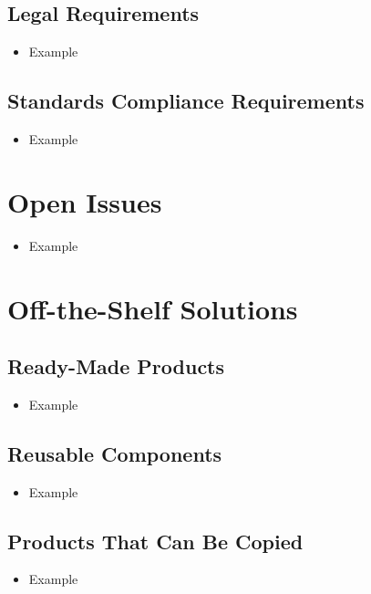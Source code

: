 \documentclass[12pt]{article}
\begin{document}
  \subsection{Legal Requirements}
    \begin{itemize}
      \item Example
    \end{itemize}

  \subsection{Standards Compliance Requirements}
    \begin{itemize}
      \item Example
    \end{itemize}

\section{Open Issues}
  \begin{itemize}
    \item Example
  \end{itemize}

\section{Off-the-Shelf Solutions}
  \subsection{Ready-Made Products}
    \begin{itemize}
      \item Example
    \end{itemize}

  \subsection{Reusable Components}
    \begin{itemize}
      \item Example
    \end{itemize}

  \subsection{Products That Can Be Copied}
    \begin{itemize}
      \item Example
    \end{itemize}
\end{document}
